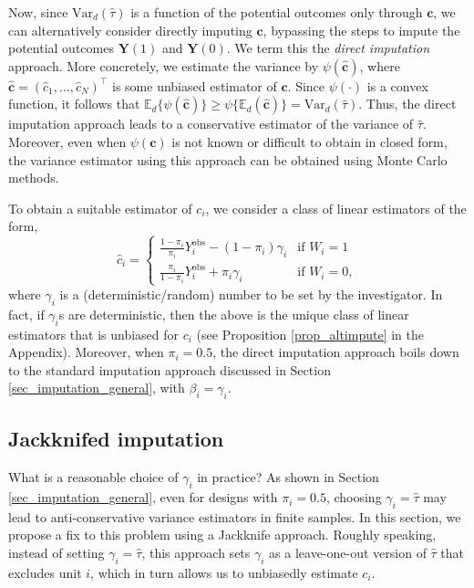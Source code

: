 \documentclass[12pt]{article}
\newcommand{\Var}{{\text{Var}}}
\newcommand{\E}{{\mathbb{E}}}
\begin{document}
 Now, since $\Var_d(\hat{\tau})$ is a function of the potential outcomes only through $\bm{c}$, we can alternatively consider directly imputing $\bm{c}$, bypassing the steps to impute the potential outcomes $\bm{Y}(1)$ and $\bm{Y}(0)$. We term this the \textit{direct imputation} approach.
More concretely, we estimate the variance by $\psi(\hat{\bm{c}})$, where $\hat{\bm{c}} = (\hat{c}_1,...,\hat{c}_N)^\top$ is some unbiased estimator of $\bm{c}$. Since $\psi(\cdot)$ is a convex function, it follows that $\E_d\{\psi(\hat{\bm{c}})\} \geq \psi\{\E_d(\hat{\bm{c}})\} = \Var_d(\hat{\tau}).$
Thus, the direct imputation approach leads to a conservative estimator of the variance of $\hat{\tau}$. 
Moreover, even when $\psi(\bm{c})$ is not known or difficult to obtain in closed form, the variance estimator using this approach can be obtained using Monte Carlo methods.

To obtain a suitable estimator of $c_i$, we consider a class of linear estimators of the form,
    \begin{equation}
  \hat{c}_i =
    \begin{cases}
    
      \frac{1-\pi_i}{\pi_i} Y^{\text{obs}}_i - (1-\pi_i)\gamma_i & \text{if $W_i = 1$}\\
    \frac{\pi_i}{1-\pi_i} Y^{\text{obs}}_i + \pi_i\gamma_i & \text{if $W_i = 0$},
    \end{cases}  
    \label{eq_ci}
\end{equation}
where $\gamma_i$ is a (deterministic/random) number to be set by the investigator. In fact, if $\gamma_i$s are deterministic, then the above is the unique class of linear estimators that is unbiased for $c_i$ (see Proposition \ref{prop_altimpute} in the Appendix). 
Moreover, when $\pi_i = 0.5$, the direct imputation approach boils down to the standard imputation approach discussed in Section \ref{sec_imputation_general}, with $\beta_i = \gamma_i$.


\subsection{Jackknifed imputation}
\label{sec_jackknife}

What is a reasonable choice of $\gamma_i$ in practice? As shown in Section \ref{sec_imputation_general}, even for designs with $\pi_i = 0.5$, choosing $\gamma_i = \hat{\tau}$ may lead to anti-conservative variance estimators in finite samples. 
In this section, we propose a fix to this problem using a Jackknife approach. Roughly speaking, instead of setting $\gamma_i=\hat{\tau}$, this approach sets $\gamma_i$ as a leave-one-out version of $\hat{\tau}$ that excludes unit $i$, which in turn allows us to unbiasedly estimate $c_i$.
\end{document}
